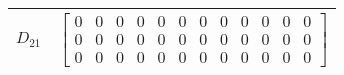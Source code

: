 \begin{tabular}{cl}
 $D_{21}$ & $\left[\begin{array}{cccccccccccc}0 & 0 & 0 & 0 & 0 & 0 & 0 & 0 & 0 & 0 & 0 & 0\\0 & 0 & 0 & 0 & 0 & 0 & 0 & 0 & 0 & 0 & 0 & 0\\0 & 0 & 0 & 0 & 0 & 0 & 0 & 0 & 0 & 0 & 0 & 0\end{array}\right]$                                                                                                                                                                                                                                                                                                                                                                                                                                                                                                                                                                                        \\
\hline
\end{tabular}